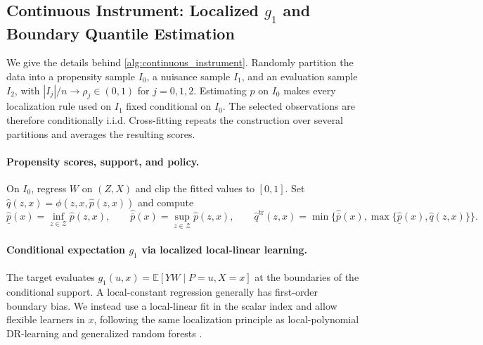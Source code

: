 \subsection{Continuous Instrument: Localized $g_1$ and Boundary Quantile Estimation}\label{app:procedure_continuous_instrument}

We give the details behind \cref{alg:continuous_instrument}. Randomly partition the data into a propensity sample $I_0$, a nuisance sample $I_1$, and an evaluation sample $I_2$, with $|I_j|/n\to\rho_j\in(0,1)$ for $j=0,1,2$. Estimating $p$ on $I_0$ makes every localization rule used on $I_1$ fixed conditional on $I_0$. The selected observations are therefore conditionally i.i.d. Cross-fitting repeats the construction over several partitions and averages the resulting scores.

\paragraph{Propensity scores, support, and policy.} On $I_0$, regress $W$ on $(Z,X)$ and clip the fitted values to $[0,1]$. Set $\hat q(z,x)=\phi(z,x,\hat p(z,x))$ and compute
    \begin{equation*}
        \hat{\underline p}(x)=\inf_{z\in\mathcal Z}\hat p(z,x),\qquad
        \hat{\overline p}(x)=\sup_{z\in\mathcal Z}\hat p(z,x),\qquad
        \hat q^{\mathrm{tr}}(z,x)=\min\{\hat{\overline p}(x),\max\{\hat{\underline p}(x),\hat q(z,x)\}\}.
    \end{equation*}

\paragraph{Conditional expectation $g_1$ via localized local-linear learning.} The target evaluates $g_1(u,x)=\mathbb E[YW\mid P=u,X=x]$ at the boundaries of the conditional support. A local-constant regression generally has first-order boundary bias. We instead use a local-linear fit in the scalar index and allow flexible learners in $x$, following the same localization principle as local-polynomial DR-learning \citep{kennedy2023towards} and generalized random forests \citep{athey2019generalized}.

